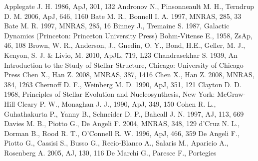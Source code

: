 \begin{thebibliography}{99}

  Applegate J. H. 1986, ApJ, 301, 132
 Andronov N., Pinsonneault M. H.,
  Terndrup D. M. 2006, ApJ, 646, 1160
 Bate
  M. R., Bonnell I. A. 1997, MNRAS, 285, 33
 Bate
  M. R. 1997, MNRAS, 285, 16
  Binney
  J., Tremaine S. 1987, Galactic Dynamics (Princeton: Princeton
  University Press)
  Bohm-Vitense E., 1958, ZsAp, 46, 108
 Brown,
  W.  R., Anderson, J., Gnedin, O. Y., Bond, H.E., Geller, M. J.,
  Kenyon, S. J. \& Livio, M. 2010, ApJL, 719, L23
  Chandrasekhar S. 1939, An Introduction to the Study of Stellar
  Structure, Chicago:  University of Chicago Press
 Chen X.,
  Han Z. 2008, MNRAS, 387, 1416
 Chen X.,
  Han Z. 2008, MNRAS, 384, 1263
 Chernoff D. F., Weinberg M. D. 1990,
  ApJ, 351, 121
 Clayton
  D. D. 1968, Principles of Stellar Evolution and Nucleosynthesis, New
  York:  McGraw-Hill
  Cleary P. W., Monaghan J. J., 1990, ApJ, 349, 150
 Cohen
  R. L., Guhathakurta P., Yanny B., Schneider D. P., Bahcall
  J. N. 1997, AJ, 113, 669
 Davies M. B., Piotto G., De Angeli
  F. 2004, MNRAS, 348, 129
 d'Cruz
  N. L., Dorman B., Rood R. T., O'Connell R. W. 1996, ApJ, 466, 359
  De Angeli F., Piotto G., Cassisi S., Busso G., Recio-Blanco A.,
  Salaris M., Aparicio A., Rosenberg A. 2005, AJ, 130, 116
 De Marchi G., Paresce F., Portegies

\end{thebibliography}
